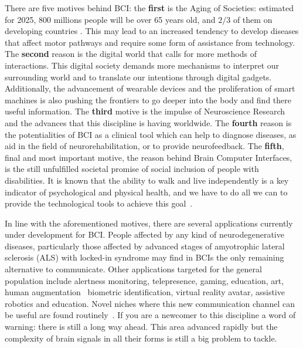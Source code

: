 
There are five motives behind BCI: the \textbf{first} is the Aging of Societies: estimated for 2025, 800 millions people will be over 65 years old, and $2/3$ of them on developing countries \cite{LloydSherlock2000}.  This may lead to an increased tendency to develop diseases that affect motor pathways and require some form of assistance from technology.  The \textbf{second} reason is the digital world that calls for more methods of interactions. This digital society demands more mechanisms to interpret our surrounding world and to translate our intentions through digital gadgets.  Additionally, the advancement of wearable devices and the proliferation of smart machines is also pushing the frontiers to go deeper into the body and find there useful information.  The \textbf{third} motive is the impulse of Neuroscience Research and the advances that this discipline is having worldwide.  The \textbf{fourth} reason is the potentialities of BCI as a clinical tool which can help to diagnose diseases, as aid in the field of neurorehabilitation,  or to provide neurofeedback.  The \textbf{fifth}, final and most important motive, the reason behind Brain Computer Interfaces, is the still unfulfilled societal promise of social inclusion of people with disabilities.  It is known that the ability to walk and live independently is a key indicator of psychological and physical health, and we have to do all we can to provide the technological tools to achieve this goal~\cite{Rao2013,Clerc2016,WolpawJonathanR2012}. 

In line with the aforementioned motives, there are several applications currently under development for BCI.  People affected by any kind of neurodegenerative diseases, particularly those affected by advanced stages of amyotrophic lateral sclerosis (ALS) with locked-in syndrome may find in BCIs the only remaining alternative to communicate. Other applications targeted for the general population include alertness monitoring, telepresence, gaming, education, art, human augmentation~\cite{Yuste2017} biometric identification, virtual reality avatar, assistive robotics and education.  Novel niches where this new communication channel can be useful are found routinely~\cite{Nam2018}. If you are a newcomer to this discipline a word of warning: there is still a long way ahead.  This area advanced rapidly but the complexity of brain signals in all their forms is still a big problem to tackle.  

